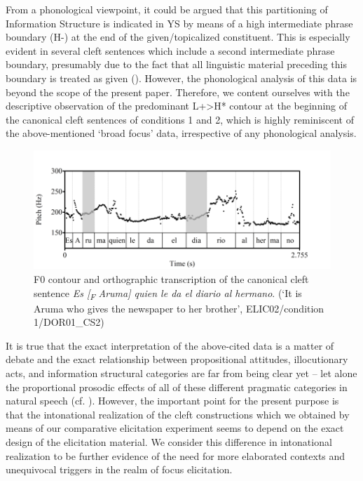 \documentclass[output=paper]{langsci/langscibook}
\begin{document}
From a phonological viewpoint, it could be argued that this partitioning of Information Structure is indicated in YS by means of a high intermediate phrase boundary (H-) at the end of the given/topicalized constituent. This is especially evident in several cleft sentences which include a second intermediate phrase boundary, presumably due to the fact that all linguistic material preceding this boundary is treated as given (). However, the phonological analysis of this data is beyond the scope of the present paper. Therefore, we content ourselves with the descriptive observation of the predominant L+>H* contour at the beginning of the canonical cleft sentences of conditions 1 and 2, which is highly reminiscent of the above-mentioned ‘broad focus' data, irrespective of any phonological analysis. 


\begin{figure}
\includegraphics[width=\textwidth]{figures/UTH-img41.png}
\caption{F0 contour and orthographic transcription of the canonical cleft sentence 
\textit{Es [\textsubscript{F}} \textit{Aruma] quien le da el diario al hermano}. 
(‘It is Aruma who gives the newspaper to her brother', ELIC02/condition 1/DOR01\_CS2)}
\label{fig:uth:18}
\end{figure}

It is true that the exact interpretation of the above-cited data is a matter of debate and the exact relationship between propositional attitudes, illocutionary acts, and information structural categories are far from being clear yet – let alone the proportional prosodic effects of all of these different pragmatic categories in natural speech (cf. \citealt{Reich17}). However, the important point for the present purpose is that the intonational realization of the cleft constructions which we obtained by means of our comparative elicitation experiment seems to depend on the exact design of the elicitation material. We consider this difference in intonational realization to be further evidence of the need for more elaborated contexts and unequivocal triggers in the realm of focus elicitation. 
\end{document}
